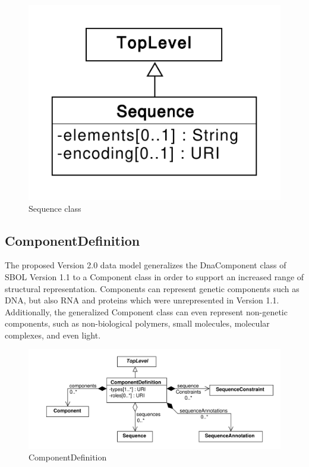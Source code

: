 \documentclass[draftspec]{sbmlpkgspec}
\begin{document}
\begin{figure}[ht]
\begin{center}
\includegraphics[scale=0.6]{uml/sequence}
\caption[]{Sequence class}
\label{uml:sequence}
\end{center}
\end{figure}




\subsection{ComponentDefinition}
\label{sec:ComponentDefinition}
The proposed Version 2.0 data model generalizes the DnaComponent class of SBOL Version 1.1 to a Component class in order to support an increased range of structural representation. Components can represent genetic components such as DNA, but also RNA and proteins which were unrepresented in Version 1.1.  Additionally, the generalized Component class can even represent non-genetic components, such as non-biological polymers, small molecules, molecular complexes, and even light.

\begin{figure}[ht]
\begin{center}
\includegraphics[width=\textwidth]{uml/component_definition}
\caption[]{ComponentDefinition}
\label{uml:component_definition}
\end{center}
\end{figure}
\end{document}
